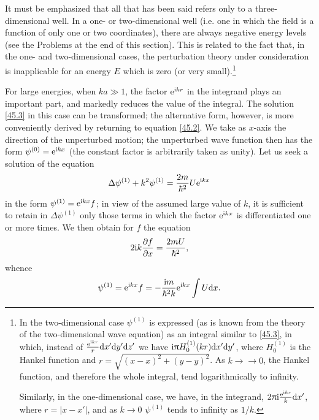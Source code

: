 It must be emphasized that all that has been said refers only to a three-dimensional well. In a one- or two-dimensional well (i.e. one in which the field is a function of only one or two coordinates), there are always negative energy levels (see the Problems at the end of this section). This is related to the fact that, in the one- and two-dimensional cases, the perturbation theory under consideration is inapplicable for an energy $ E $ which is zero (or very small).\footnote{In the two-dimensional case $ \psi^{(1)} $ is expressed (as is known from the theory of the two-dimensional wave equation) as an integral similar to \eqref{45.3}, in which, instead of $ \frac{\mathrm{e}^{\mathrm{i} kr}}{r}\mathrm{d} x'\mathrm{d} y'\mathrm{d} z' $ we have $ \mathrm{i}\uppi H_0^{(1)} (kr) \mathrm{d} x'\mathrm{d} y' $, where $ H_0^{(1)} $ is the Hankel function and $ r =\sqrt{(x - x)^2 + (y - y)^2}  $. As $ k →\to0 $, the Hankel function, and therefore the whole integral, tend logarithmically to infinity.
	

Similarly, in the one-dimensional case, we have, in the integrand, $ 2\uppi\mathrm{i}\frac{\mathrm{e}^{\mathrm{i} kr}}{k}\mathrm{d} x'$, where $ r = |x -x'| $, and as $ k \to0 $ $ \psi^{(1)} $ tends to infinity as $ 1/k $.}

For large energies, when $ ka\gg 1 $, the factor $ \mathrm{e}^{\mathrm{i} kr} $ in the integrand plays an important part, and markedly reduces the value of the integral. The solution \eqref{45.3} in this case can be transformed; the alternative form, however, is more conveniently derived by returning to equation \eqref{45.2}. We take as $ x $-axis the direction of the unperturbed motion; the unperturbed wave function then has the form $ \psi^{(0)} = \mathrm{e}^{\mathrm{i} kx} $ (the constant factor is arbitrarily taken as unity). Let us seek a solution of the equation
\[ \Delta \psi^{(1)}+k^2\psi^{(1)}=\frac{2m}{\hbar^2}U\mathrm{e}^{\mathrm{i} kx} \]
in the form $ \psi^{(1)} = \mathrm{e}^{\mathrm{i} kx}f $; in view of the assumed large value of $ k $, it is sufficient to retain in $ \Delta \psi^{(1)} $ only those terms in which the factor $ \mathrm{e}^{\mathrm{i} kx} $ is differentiated one or more times. We then obtain for $ f $ the equation
\[ 2\mathrm{i} k\frac{\partial f}{\partial x}=\frac{2mU}{\hbar^2}, \]
whence
\begin{equation}\label{45.5}
\psi^{(1)}=\mathrm{e}^{\mathrm{i} kx}f=-\frac{\mathrm{i} m}{\hbar^2 k}\mathrm{e}^{\mathrm{i} kx}\int U\mathrm{d} x.
\end{equation}




